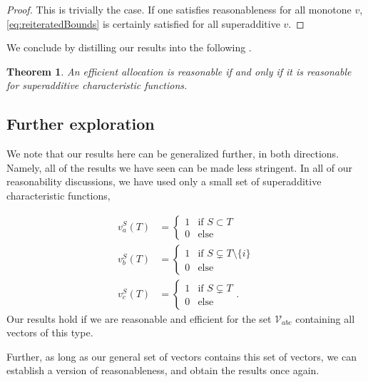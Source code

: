 \documentclass[12pt,letterpaper,final]{article}
\theoremstyle{plain}
\newtheorem{theorem}{Theorem}[section]
\theoremstyle{plain}
\theoremstyle{plain}
\theoremstyle{plain}
\theoremstyle{plain}
\theoremstyle{plain}
\theoremstyle{plain}
\theoremstyle{definition}
\theoremstyle{definition}
\theoremstyle{definition}
\theoremstyle{definition}
\theoremstyle{definition}
\theoremstyle{remark}
\theoremstyle{remark}
\theoremstyle{remark}
\theoremstyle{remark}
\begin{document}
\begin{proof}
  This is trivially the case. If one satisfies
  reasonableness for all monotone \(v\),
  \cref{eq:reiteratedBounds} is certainly satisfied for all
  superadditive \(v\).
\end{proof}

We conclude by distilling our results into the
following .

\begin{theorem}\label{thm:reas-superreas}
  An efficient allocation is reasonable if and only if it is
  reasonable for superadditive characteristic functions.
\end{theorem}

\subsection{Further exploration}

We note that our results here can be generalized further, in both
directions. Namely, all of the results we have seen can be made less
stringent. In all of our reasonability discussions, we have used only a
small set of superadditive characteristic functions, 

\begin{align*}
  v^S_a(T) &=
             \begin{cases}
               1 & \text{if } S \subset T\\
               0 & \text{else}
             \end{cases}\\
  v^S_b(T) &=
             \begin{cases}
               1 & \text{if } S \subsetneq T\setminus\{i\}\\
               0 & \text{else}
             \end{cases}\\
  v^S_c(T) &=
             \begin{cases}
               1 & \text{if } S \subsetneq T\\
               0 & \text{else}
             \end{cases}.
\end{align*}
Our results hold if we are reasonable and efficient for the set \(\mathcal{V}_{abc}\) 
containing all vectors of this type.

Further, as long as our general set of vectors contains this set of
vectors, we can establish a version of reasonableness, and obtain the
results once again.
\end{document}
